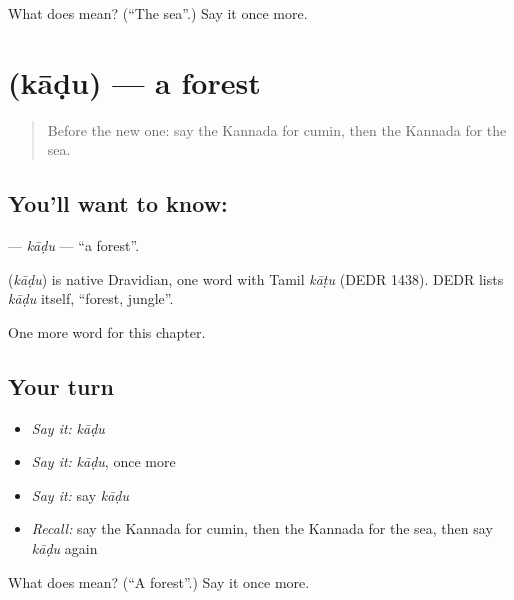 \begin{tcolorbox}[breakable,colback=teal!4,colframe=teal!35!black,title={Before you move on}]
What does  mean? (\textquotedblleft{}The sea\textquotedblright{}.) Say it once more.
\end{tcolorbox}
\section[\texorpdfstring{\kn{ಕಾಡು} (kāḍu)}{ಕಾಡು (kāḍu)}]{ (kāḍu) — a forest}

\label{lesson:KA-C127-kadu}



\begin{quote}
Before the new one: say the Kannada for cumin, then the Kannada for the sea.
\end{quote}

\subsection*{You'll want to know: }
\textbf{} — \emph{kāḍu} — \textquotedblleft{}a forest\textquotedblright{}.

\begin{cousinweb}
\textbf{} (\emph{kāḍu}) is native Dravidian, one word with Tamil \emph{kāṭu} (DEDR 1438). DEDR lists \emph{kāḍu} itself, \textquotedblleft{}forest, jungle\textquotedblright{}.
\end{cousinweb}

\begin{grammarlens}[title={What you've built}]
One more word for this chapter.
\end{grammarlens}

\subsection*{Your turn}
\begin{itemize}
\raggedright
  \item \emph{Say it:} \emph{kāḍu}
  \item \emph{Say it:} \emph{kāḍu}, once more
  \item \emph{Say it:} say \emph{kāḍu}
  \item \emph{Recall:} say the Kannada for cumin, then the Kannada for the sea, then say \emph{kāḍu} again
\end{itemize}

\begin{tcolorbox}[breakable,colback=teal!4,colframe=teal!35!black,title={Before you move on}]
What does  mean? (\textquotedblleft{}A forest\textquotedblright{}.) Say it once more.
\end{tcolorbox}
